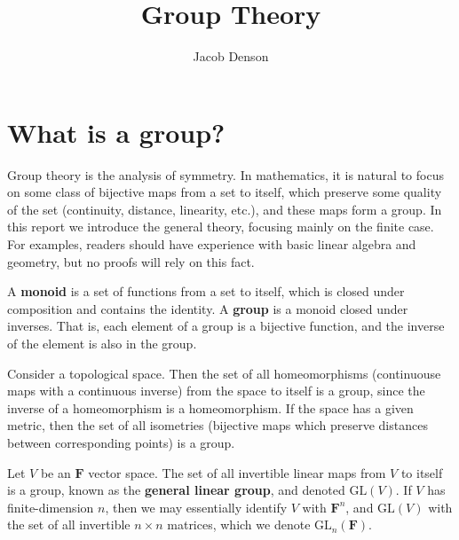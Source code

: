 

\title{Group Theory}
\author{Jacob Denson}



\maketitle
\tableofcontents
{}

\chapter{What is a group?}

Group theory is the analysis of symmetry. In mathematics, it is natural to focus on some class of bijective maps from a set to itself, which preserve some quality of the set (continuity, distance, linearity, etc.), and these maps form a group. In this report we introduce the general theory, focusing mainly on the finite case. For examples, readers should have experience with basic linear algebra and geometry, but no proofs will rely on this fact.

\begin{definition}
    A {\bf monoid} is a set of functions from a set to itself, which is closed under composition and contains the identity. A {\bf group} is a monoid closed under inverses. That is, each element of a group is a bijective function, and the inverse of the element is also in the group.
\end{definition}

\begin{example}
    Consider a topological space. Then the set of all homeomorphisms (continuouse maps with a continuous inverse) from the space to itself is a group, since the inverse of a homeomorphism is a homeomorphism. If the space has a given metric, then the set of all isometries (bijective maps which preserve distances between corresponding points) is a group.
\end{example}

\begin{example}
    Let $V$ be an $\mathbf{F}$ vector space. The set of all invertible linear maps from $V$ to itself is a group, known as the {\bf general linear group}, and denoted $\mathrm{GL}(V)$. If $V$ has finite-dimension $n$, then we may essentially identify $V$ with $\mathbf{F}^n$, and $\mathrm{GL}(V)$ with the set of all invertible $n \times n$ matrices, which we denote $\mathrm{GL}_n(\mathbf{F})$.
\end{example}

